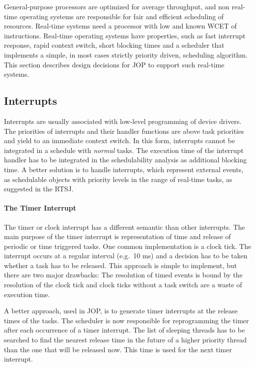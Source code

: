 General-purpose processors are optimized for average throughput, and
non real-time operating systems are responsible for fair and
efficient scheduling of resources. Real-time systems need a processor
with low and known WCET of instructions. Real-time operating systems
have properties, such as fast interrupt response, rapid context
switch, short blocking times and a scheduler that implements a
simple, in most cases strictly priority driven, scheduling algorithm.
This section describes design decisions for JOP to support such
real-time systems.

\subsection{Interrupts}

Interrupts are usually associated with low-level programming of
device drivers. The priorities of interrupts and their handler
functions are above task priorities and yield to an immediate
context switch. In this form, interrupts cannot be integrated in a
schedule with \emph{normal} tasks. The execution time of the
interrupt handler has to be integrated in the schedulability
analysis as additional blocking time. A better solution is to handle
interrupts, which represent external events, as schedulable objects
with priority levels in the range of real-time tasks, as suggested
in the RTSJ.

\paragraph{The Timer Interrupt}

The timer or clock interrupt has a different semantic than other
interrupts. The main purpose of the timer interrupt is
representation of time and release of periodic or time triggered
tasks. One common implementation is a clock tick. The interrupt
occurs at a regular interval (e.g.\ 10 ms) and a decision has to be
taken whether a task has to be released. This approach is simple to
implement, but there are two major drawbacks: The resolution of
timed events is bound by the resolution of the clock tick and clock
ticks without a task switch are a waste of execution time.

A better approach, used in JOP, is to generate timer interrupts at
the release times of the tasks. The scheduler is now responsible for
reprogramming the timer after each occurrence of a timer interrupt.
The list of sleeping threads has to be searched to find the nearest
release time in the future of a higher priority thread than the one
that will be released now. This time is used for the next timer
interrupt.

